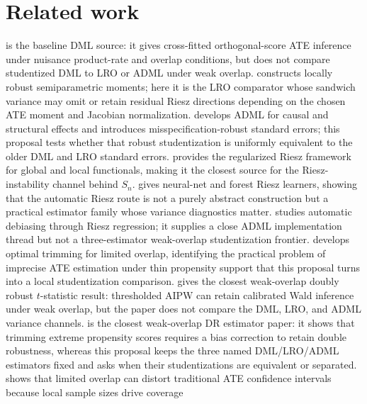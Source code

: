 \documentclass[11pt]{article}
\theoremstyle{definition}
\theoremstyle{plain}
\theoremstyle{remark}
\begin{document}
\section{Related work}
\citet{ChernozhukovEtAl2018DML} is the baseline DML source: it gives
cross-fitted orthogonal-score ATE inference under nuisance product-rate and
overlap conditions, but does not compare studentized DML to LRO or ADML under
weak overlap.
\citet{ChernozhukovEscancianoIchimuraNeweyRobins2022LRO} constructs locally
robust semiparametric moments; here it is the LRO comparator whose sandwich
variance may omit or retain residual Riesz directions depending on the chosen
ATE moment and Jacobian normalization.
\citet{ChernozhukovNeweySingh2022ADML} develops ADML for causal and structural
effects and introduces misspecification-robust standard errors; this proposal
tests whether that robust studentization is uniformly equivalent to the older
DML and LRO standard errors.
\citet{ChernozhukovNeweySingh2022RR} provides the regularized Riesz framework
for global and local functionals, making it the closest source for the
Riesz-instability channel behind \(S_n\).
\citet{ChernozhukovNeweyQuintasMartinezSyrgkanis2022RieszNet} gives neural-net
and forest Riesz learners, showing that the automatic Riesz route is not a
purely abstract construction but a practical estimator family whose variance
diagnostics matter.
\citet{ChernozhukovNeweyQuintasMartinezSyrgkanis2024RieszRegression} studies
automatic debiasing through Riesz regression; it supplies a close ADML
implementation thread but not a three-estimator weak-overlap studentization
frontier.
\citet{CrumpHotzImbensMitnik2009Overlap} develops optimal trimming for limited
overlap, identifying the practical problem of imprecise ATE estimation under
thin propensity support that this proposal turns into a local studentization
comparison.
\citet{Dorn2025WeakOverlapTStats} gives the closest weak-overlap
doubly robust \(t\)-statistic result: thresholded AIPW can retain calibrated
Wald inference under weak overlap, but the paper does not compare the DML,
LRO, and ADML variance channels.
\citet{MaSantAnnaSasakiUra2026WeakOverlapDR} is the closest weak-overlap DR
estimator paper: it shows that trimming extreme propensity scores requires a
bias correction to retain double robustness, whereas this proposal keeps the
three named DML/LRO/ADML estimators fixed and asks when their studentizations
are equivalent or separated.
\citet{Rothe2017LimitedOverlapCI} shows that limited overlap can distort
traditional ATE confidence intervals because local sample sizes drive coverage
\end{document}
